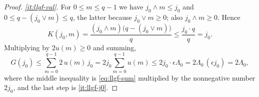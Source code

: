 \begin{proof}
\emph{\ref{it:llgf-val}.} For $0\le m\le q-1$ we have $j_0\wedge m\le j_0$ and
$0\le q-(j_0\vee m)\le q$, the latter because $j_0\vee m\ge0$; also
$j_0\wedge m\ge0$. Hence
\[
  K(j_0,m)=\frac{(j_0\wedge m)\bigl(q-(j_0\vee m)\bigr)}{q}
   \le\frac{j_0\cdot q}{q}=j_0 .
\]
Multiplying by $2u(m)\ge0$ and summing,
\[
  G(j_0)\le\sum_{m=0}^{q-1}2\,u(m)\,j_0
   =2j_0\sum_{m=0}^{q-1}u(m)
   \le2j_0\cdot\epsilon\Lambda_0
   =2\Lambda_0\,(\epsilon j_0)=2\Lambda_0 ,
\]
where the middle inequality is \eqref{eq:llgf-sum} multiplied by the
nonnegative number $2j_0$, and the last step is \ref{it:llgf-j0}.
\end{proof}
